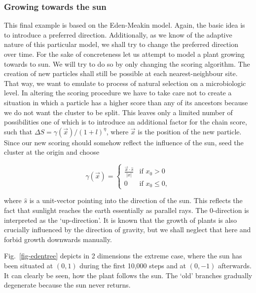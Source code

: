 \documentclass[twocolumn,10pt]{scrartcl}
\begin{document}
            \subsubsection{Growing towards the sun}
                This final example is based on the Eden-Meakin model. Again, the basic idea is to introduce a preferred
                direction. Additionally, as we know of the adaptive nature of this particular model, we shall try to
                change the preferred direction over time. For the sake of concreteness let us attempt to model a plant
                growing towards to sun. We will try to do so by only changing the scoring algorithm. The creation of
                new particles shall still be possible at each nearest-neighbour site. That way, we want to emulate to
                process of natural selection on a microbiologic level. In altering the scoring procedure we have to take
                care not to create a situation in which a particle has a higher score than any of its ancestors because
                we do not want the cluster to be split. This leaves only a limited number of possibilities one of which
                is to introduce an additional factor for the chain score, such that $\Delta S=\gamma(\vec x)/(1+l)^\eta$,
                where $\vec x$ is the position of the new particle. Since our new scoring should somehow reflect the
                influence of the sun, seed the cluster at the origin and choose
                
                \begin{equation*}
                    \gamma(\vec x)=
                    \begin{cases}
                            \frac{\vec x\cdot \hat s}{|x|}  & \text{if $x_0>0$} \\
                            0 & \text{if $x_0\le 0$},
                    \end{cases}
                \end{equation*}

                where $\hat s$ is a unit-vector pointing into the direction of the sun. This reflects the fact
                that sunlight reaches the earth essentially as parallel rays. The 0-direction is
                interpreted as the `up-direction'. It is known that the growth
                of plants is also crucially influenced by the direction of gravity, but we shall neglect that here
                and forbid growth downwards manually.

                Fig.~\ref{fig-edentree} depicts in 2 dimensions the extreme case, where the sun has been situated
                at $(0,1)$ during the first 10,000 steps and at $(0, -1)$ afterwards. It can clearly be seen, how
                the plant follows the sun. The `old' branches gradually degenerate because the sun never returns.
\end{document}

